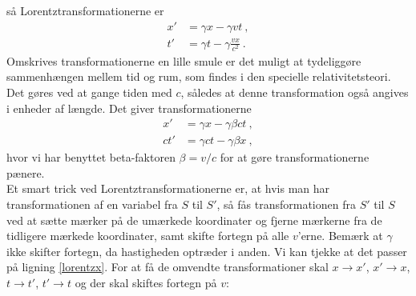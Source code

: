 så Lorentztransformationerne er
\begin{subequations}
\begin{align}
    x'&=\gamma x-\gamma vt \: , \label{rel:LorentzXComposant} \\
    t'&=\gamma t-\gamma\frac{vx}{c^2} \: . \label{rel:LorentzTComposant}
\end{align}
\end{subequations}
Omskrives transformationerne en lille smule er det muligt at tydeliggøre sammenhængen mellem tid og rum, som findes i den specielle relativitetsteori.
Det gøres ved at gange tiden med $c$, således at denne transformation også angives i enheder af længde.
Det giver transformationerne
\begin{subequations}
\begin{align}
    x'&=\gamma x-\gamma\beta ct \: , \label{rel:LorentzXComposantWithBeta}\\
    ct'&=\gamma ct-\gamma\beta x \: , \label{rel:LorentzTComposantWithBeta}
\end{align}
\end{subequations}
hvor vi har benyttet beta-faktoren $\beta = v/c$ for at gøre transformationerne pænere. \\

Et smart trick ved Lorentztransformationerne er, at hvis man har transformationen af en variabel fra $S$ til $S'$, så fås transformationen fra $S'$ til $S$ ved at sætte mærker på de umærkede koordinater og fjerne mærkerne fra de tidligere mærkede koordinater, samt skifte fortegn på alle $v$'erne. Bemærk at $\gamma$ ikke skifter fortegn, da hastigheden optræder i anden. Vi kan tjekke at det passer på ligning \eqref{lorentzx}. For at få de omvendte transformationer skal $x \rightarrow x'$, $x' \rightarrow x$, $t \rightarrow t'$, $t' \rightarrow t$ og der skal skiftes fortegn på $v$:
%
\begin{center}
\end{center}

